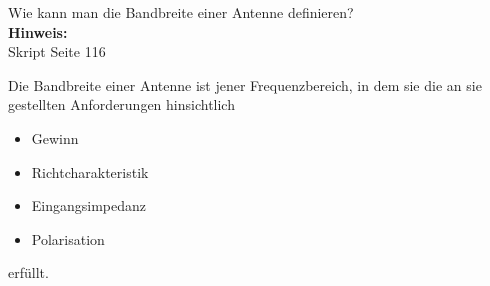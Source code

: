 \begin{question}[section=11,name={Bandbreite},difficulty=,quantity=6,type=thr,tags={20151210,20131210}]
	Wie kann man die Bandbreite einer Antenne definieren?
	\\ \textbf{Hinweis:}\\
	Skript Seite 116
\end{question}
\begin{solution}
	Die Bandbreite einer Antenne ist jener Frequenzbereich, in dem sie die an sie gestellten Anforderungen hinsichtlich
	\begin{itemize}
		\item{Gewinn}
		\item{Richtcharakteristik}
		\item{Eingangsimpedanz}
		\item{Polarisation}
	\end{itemize}
	erfüllt.
\end{solution}